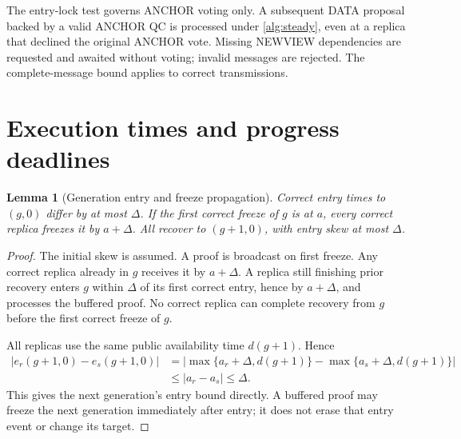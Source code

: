 \documentclass[11pt,a4paper]{article}
\newtheorem{lemma}[lemma]{Lemma}
\begin{document}
The entry-lock test governs ANCHOR voting only. A subsequent DATA proposal
backed by a valid ANCHOR QC is processed under \cref{alg:steady}, even at
a replica that declined the original ANCHOR vote. Missing NEWVIEW
dependencies are requested and awaited without voting; invalid messages
are rejected. The complete-message bound applies to correct transmissions.

\section{Execution times and progress deadlines}
\label{sec:timing}
\begin{lemma}[Generation entry and freeze propagation]
\label{lem:entry}
Correct entry times to $(g,0)$ differ by at most $\Delta$. If the first
correct freeze of $g$ is at $a$, every correct replica freezes it by
$a+\Delta$. All recover to $(g+1,0)$, with entry skew at most $\Delta$.
\end{lemma}
\begin{proof}
The initial skew is assumed. A proof is broadcast on first freeze.
Any correct replica already in $g$ receives it by $a+\Delta$.
A replica still finishing prior recovery enters $g$ within $\Delta$
of its first correct entry, hence by $a+\Delta$, and processes the
buffered proof. No correct replica can complete recovery from $g$ before
the first correct freeze of $g$.

All replicas use the same public availability time $d(g+1)$. Hence
\[
\begin{aligned}
 |e_r(g+1,0)-e_s(g+1,0)|
 &=\big|\max\{a_r+\Delta,d(g+1)\}
          -\max\{a_s+\Delta,d(g+1)\}\big|\\
 &\le |a_r-a_s|\le\Delta.
\end{aligned}
\]
This gives the next generation's entry bound directly.
A buffered proof may freeze the next generation immediately after entry;
it does not erase that entry event or change its target.
\end{proof}
\end{document}
